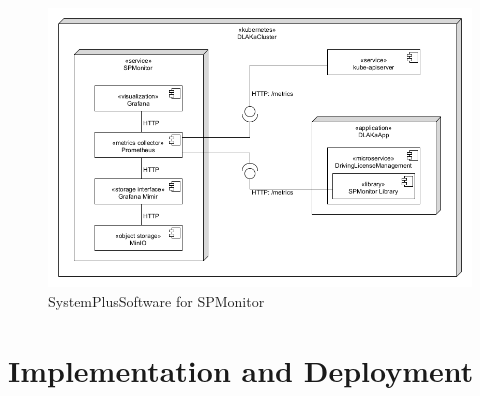 \begin{figure}[tb]
  \centering
  \includegraphics[width=\textwidth]{figures/sps_spmonitor.png}
  \caption{SystemPlusSoftware for SPMonitor}
  \label{fig:sps_spmonitor}
\end{figure}

\section{Implementation and Deployment}
\label{sec:impl_and_deployment}




